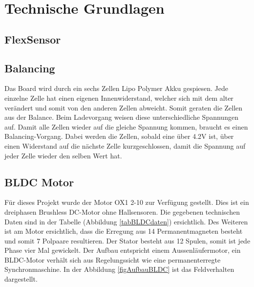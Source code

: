 \chapter{Technische Grundlagen}
\label{TechnischeGrundlagen}
\section{FlexSensor}
\label{tGl_FlexSensor}
\section{Balancing}
\label{tGl_Balancing}
Das Board wird durch ein sechs Zellen Lipo Polymer Akku gespiesen. Jede einzelne Zelle hat einen eigenen Innenwiderstand, welcher sich mit dem alter verändert und somit von den anderen Zellen abweicht. Somit geraten die Zellen aus der Balance. Beim Ladevorgang weisen diese unterschiedliche Spannungen auf. Damit alle Zellen wieder auf die gleiche Spannung kommen, braucht es einen Balancing-Vorgang. Dabei werden die Zellen, sobald eine über 4.2V ist, über einen Widerstand auf die nächste Zelle kurzgeschlossen, damit die Spannung auf jeder Zelle wieder den selben Wert hat.


\section{BLDC Motor}
\label{tGl_BLDC}

Für dieses Projekt wurde der Motor OX1 2-10 zur Verfügung gestellt. Dies ist ein dreiphasen Brushless DC-Motor ohne Hallsensoren. Die gegebenen technischen Daten sind in der Tabelle (Abbildung \ref{tabBLDCdaten}) ersichtlich. 
Des Weiteren ist am Motor ersichtlich, dass die Erregung aus 14 Permanentmagneten besteht und somit 7 Polpaare resultieren. Der Stator besteht aus 12 Spulen, somit ist jede Phase vier Mal gewickelt.
Der Aufbau entspricht einem Aussenläufermotor, ein BLDC-Motor verhält sich aus Regelungssicht wie eine permanenterregte Synchronmaschine. In der Abbildung \ref{figAufbauBLDC} ist das Feldverhalten dargestellt.\\

